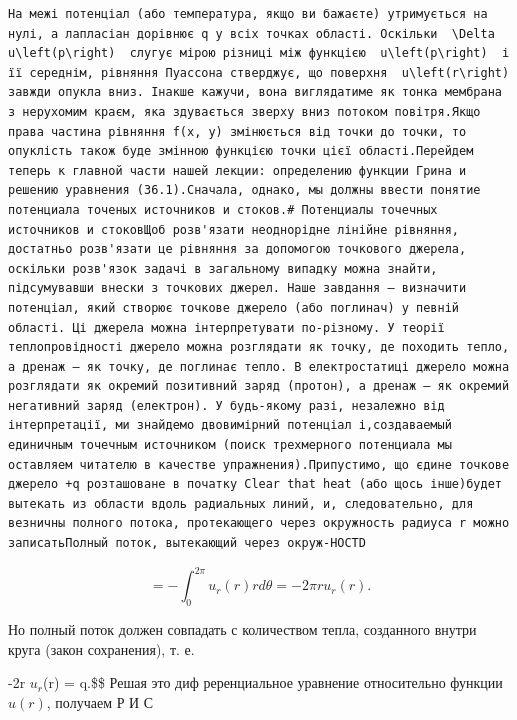 \documentclass[
  ukrainian,
]{article}
\begin{document}
\begin{verbatim}
На межі потенціал (або температура, якщо ви бажаєте) утримується на нулі, а лапласіан дорівнює q у всіх точках області. Оскільки  \Delta u\left(p\right)  слугує мірою різниці між функцією  u\left(p\right)  і її середнім, рівняння Пуассона стверджує, що поверхня  u\left(r\right)  завжди опукла вниз. Інакше кажучи, вона виглядатиме як тонка мембрана з нерухомим краєм, яка здувається зверху вниз потоком повітря.Якщо права частина рівняння f(x, y) змінюється від точки до точки, то опуклість також буде змінною функцією точки цієї області.Перейдем теперь к главной части нашей лекции: определению функции Грина и решению уравнения (36.1).Сначала, однако, мы должны ввести понятие потенциала точеных источников и стоков.# Потенциалы точечных источников и стоковЩоб розв'язати неоднорідне лінійне рівняння, достатньо розв'язати це рівняння за допомогою точкового джерела, оскільки розв'язок задачі в загальному випадку можна знайти, підсумувавши внески з точкових джерел. Наше завдання — визначити потенціал, який створює точкове джерело (або поглинач) у певній області. Ці джерела можна інтерпретувати по-різному. У теорії теплопровідності джерело можна розглядати як точку, де походить тепло, а дренаж — як точку, де поглинає тепло. В електростатиці джерело можна розглядати як окремий позитивний заряд (протон), а дренаж — як окремий негативний заряд (електрон). У будь-якому разі, незалежно від інтерпретації, ми знайдемо двовимірний потенціал і,создаваемый единичным точечным источником (поиск трехмерного потенциала мы оставляем читателю в качестве упражнения).Припустимо, що єдине точкове джерело +q розташоване в початку Clear that heat (або щось інше)будет вытекать из области вдоль радиальных линий, и, следовательно, для везничны полного потока, протекающего через окружность радиуса r можно записатьПолный поток, вытекающий через окруж-HOCTD
\end{verbatim}

\[
= -\int_{0}^{2\pi} u_{r}(r) r d\theta = -2\pi r u_{r}(r).
\]

Но полный поток должен совпадать с количеством тепла, созданного внутри
круга (закон сохранения), т. е.

-2\pi r \(u_r\)(r) = q.\$\$ Решая это диф реренциальное уравнение
относительно функции \(u(r)\), получаем Р И С
\end{document}
